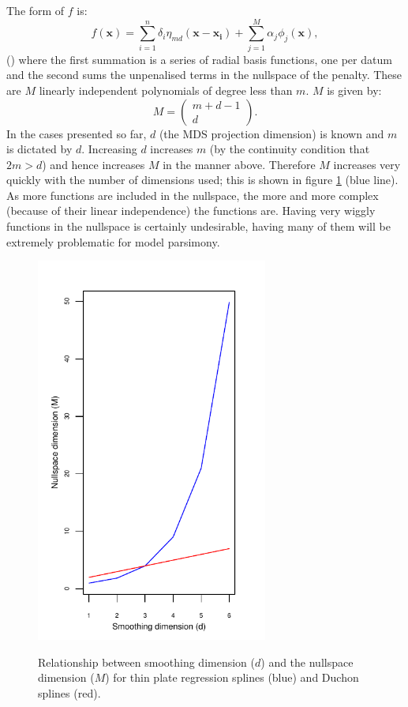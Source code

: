 The form of $f$ is:
\begin{equation}
f(\mathbf{x}) = \sum_{i=1}^n \delta_i \eta_{md}(\mathbf{x}-\mathbf{x_i}) + \sum_{j=1}^M \alpha_j \phi_j(\mathbf{x}),
\label{tprs-basis}
\end{equation}
(\cite{wood2003}) where the first summation is a series of radial basis functions, one per datum and the second sums the unpenalised terms in the nullspace of the penalty. These are $M$ linearly independent polynomials of degree less than $m$. $M$ is given by:
\begin{equation*}
M=\begin{pmatrix} m+d-1 \\ d  \end{pmatrix}.
\end{equation*}
In the cases presented so far, $d$ (the MDS projection dimension) is known and $m$ is dictated by $d$. Increasing $d$ increases $m$ (by the continuity condition that $2m>d$) and hence increases $M$ in the manner above. Therefore $M$ increases very quickly with the number of dimensions used; this is shown in figure \ref{nullspace-dim} (blue line). As more functions are included in the nullspace, the more and more complex (because of their linear independence) the functions are. Having very wiggly functions in the nullspace is certainly undesirable, having many of them will be extremely problematic for model parsimony. 

\begin{figure}
\centering
\includegraphics[width=3in]{gds/figs/nullspace-dim.pdf} \\
\caption{Relationship between smoothing dimension ($d$) and the nullspace dimension ($M$) for thin plate regression splines (blue) and Duchon splines (red).}
\label{nullspace-dim}
\end{figure}

